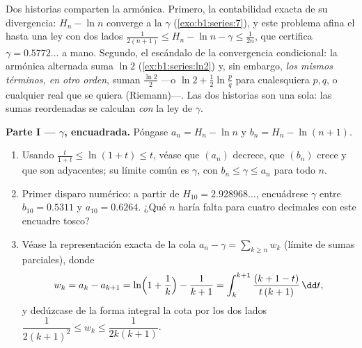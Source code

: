 \begin{problem}[{Problema del fin de semana --- $H_n = \ln n + \gamma +
\frac{1}{2n} + O(n^{-2})$, y la reordenación de
$1 - \frac12 + \frac13 - \dots$ hasta $\frac{\ln 2}{2}$}]
\label{pb:b1:series:1}
Dos historias comparten la  armónica. Primero, la contabilidad
exacta de su divergencia: $H_n - \ln n$ converge a la  $\gamma$ (\cref{exo:b1:series:7}), y este problema afina el
 hasta una ley con dos lados
$\frac{1}{2(n+1)} \leq H_n - \ln n - \gamma \leq \frac{1}{2n}$, que
certifica $\gamma = 0.5772\dots$ a mano. Segundo, el escándalo de la
convergencia condicional: la  armónica alternada suma $\ln 2$
(\cref{ex:b1:series:ln2}) y, sin embargo, \emph{los mismos términos,
en otro orden}, suman $\frac{\ln 2}{2}$ ---o
$\ln 2 + \frac12\ln\frac pq$ para cualesquiera $p, q$, o cualquier
real que se quiera (Riemann)---. Las dos historias son una sola: las
sumas reordenadas se calculan \emph{con} la ley de
$\gamma$.

\medskip
\noindent\textbf{Parte I --- $\gamma$, encuadrada.} Póngase
$a_n = H_n - \ln n$ y $b_n = H_n - \ln(n+1)$.
\begin{enumerate}
  \item Usando $\frac{t}{1+t} \leq \ln(1 + t) \leq t$, véase que
        $(a_n)$ decrece, que $(b_n)$ crece y que son adyacentes; su
        límite común es $\gamma$, con $b_n \leq \gamma \leq a_n$
        para todo $n$.
  \item Primer disparo numérico: a partir de
        $H_{10} = 2.928968\dots$, encuádrese $\gamma$ entre
        $b_{10} = 0.5311$ y $a_{10} = 0.6264$. ¿Qué $n$ haría falta
        para cuatro decimales con este encuadre tosco?
  \item Véase la representación exacta de la cola
        $a_n - \gamma = \sum_{k \geq n} w_k$ (límite de sumas
        parciales), donde
        \[
        w_k = a_k - a_{k+1}
        = \ln\Bigl(1 + \frac1k\Bigr) - \frac{1}{k+1}
        = \int_k^{k+1} \frac{(k + 1 - t)}{t\,(k+1)}\,\dd t ,
        \]
        y dedúzcase de la forma integral la cota por los dos lados
        $\dfrac{1}{2(k+1)^2} \leq w_k \leq \dfrac{1}{2k(k+1)}$.
\end{enumerate}


\end{problem}
